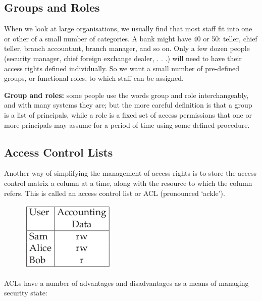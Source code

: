 		\subsection{Groups and Roles}
			When we look at large organisations, we usually find that most staff fit into
			one or other of a small number of categories. A bank might have 40 or 50:
			teller, chief teller, branch accountant, branch manager, and so on. Only a few
			dozen people (security manager, chief foreign exchange dealer, . . .) will need
			to have their access rights defined individually.
			So we want a small number of pre-defined groups, or functional roles,
			to which staff can be assigned. 

			{\bf Group and roles:} some people use the words group and role
			interchangeably, and with many systems they are; but the more careful
			definition is that a group is a list of principals, while a role is a fixed set of
			access permissions that one or more principals may assume for a period of time
			using some defined procedure. 


		\subsection{Access Control Lists}

			Another way of simplifying the management of access rights is to store the
			access control matrix a column at a time, along with the resource to which
			the column refers. This is called an access control list or ACL (pronounced
			‘ackle’).

			\begin{figure}[H]
				\includegraphics[scale=0.6]{pics/accessControlLists.png}
			\end{figure}

			ACLs have a number of advantages and disadvantages as a means of
			managing security state:


